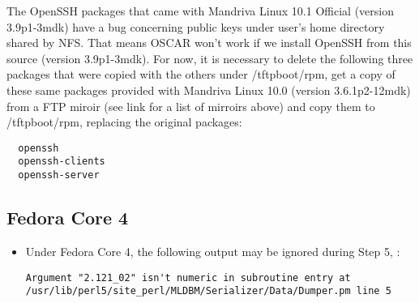\begin{itemize}
The OpenSSH packages that came with Mandriva Linux 10.1 Official (version 
3.9p1-3mdk) have a bug concerning public keys under user's home directory 
shared by NFS. That means OSCAR won't work if we install OpenSSH from this 
source (version 3.9p1-3mdk). For now, it is necessary to delete the following 
three packages that were copied with the others under /tftpboot/rpm, get a copy 
of these same packages provided with Mandriva Linux 10.0 (version 3.6.1p2-12mdk) 
from a FTP miroir (see link for a list of mirroirs above) and copy them to 
/tftpboot/rpm, replacing the original packages:
\begin{verbatim}
  openssh
  openssh-clients
  openssh-server
\end{verbatim}

\end{itemize}

\subsection{Fedora Core 4}
\label{subsec:fc4notes}

\begin{itemize}
\item Under Fedora Core 4, the following output may be ignored during 
Step 5, :
\begin{verbatim}
Argument "2.121_02" isn't numeric in subroutine entry at 
/usr/lib/perl5/site_perl/MLDBM/Serializer/Data/Dumper.pm line 5
\end{verbatim}
\end{itemize}

